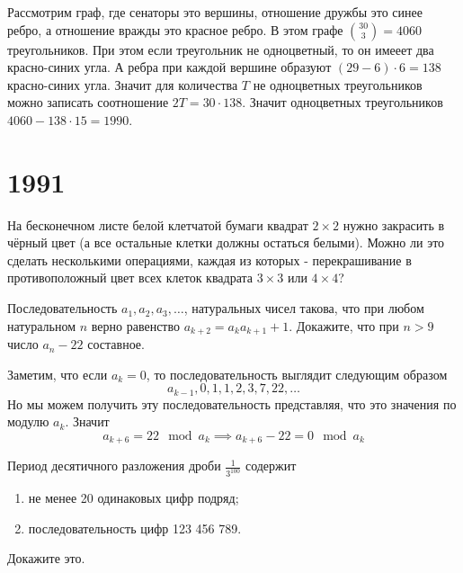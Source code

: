 \documentclass[11pt, a4paper]{common/document_template}
\begin{document}
\begin{Solution}
Рассмотрим граф, где сенаторы это вершины, отношение дружбы это синее ребро, а отношение вражды это красное ребро. В этом графе $\binom{30}{3} = 4060$ треугольников. При этом если треугольник не одноцветный, то он имееет два красно-синих угла. А ребра при каждой вершине образуют $(29 - 6) \cdot 6 = 138$ красно-синих угла. Значит для количества $T$ не одноцветных треугольников можно записать соотношение $2 T = 30 \cdot 138$. Значит одноцветных треугольников $4060 - 138 \cdot 15 = 1990$.
\end{Solution}

\chapter{1991}

\begin{exercise}[1264]
На бесконечном листе белой клетчатой бумаги квадрат $2 \times 2$ нужно закрасить в чёрный цвет (а все остальные клетки должны остаться белыми). Можно ли это сделать несколькими операциями, каждая из которых - перекрашивание в противоположный цвет всех клеток квадрата $3 \times 3$ или $4 \times 4$?
\end{exercise}

\begin{exercise}[1275]
Последовательность $a_{1}, a_{2}, a_{3}, \dots$, натуральных чисел такова, что при любом натуральном $n$ верно равенство $a_{k+2} = a_{k} a_{k+1} + 1$. Докажите, что при $n > 9$ число $a_{n} - 22$ составное.
\end{exercise}

\begin{Solution}
Заметим, что если $a_{k} = 0$, то последовательность выглядит следующим образом
$$
a_{k-1}, 0, 1, 1, 2, 3, 7, 22, \dots 
$$
Но мы можем получить эту последовательность представляя, что это значения по модулю $a_{k}$. Значит 
$$
a_{k+6} = 22 \mod a_{k} \implies a_{k+6} - 22 = 0 \mod a_{k}
$$
\end{Solution}

\begin{exercise}[1280]
Период десятичного разложения дроби $\frac{1}{3^{100}}$ содержит
\begin{enumerate}
\item не менее 20 одинаковых цифр подряд;
\item последовательность цифр 123 456 789.
\end{enumerate}
Докажите это.
\end{exercise}
\end{document}
